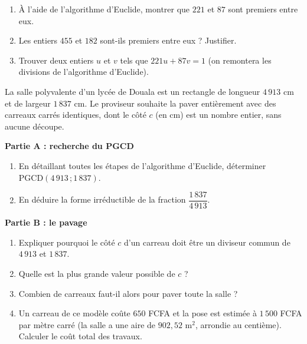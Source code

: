 \documentclass[11pt]{article}
\newcounter{popsec}
\newcounter{popsub}
\newcommand{\courssub}[1]{%
  \stepcounter{popsub}%
  \par\vspace{9pt}\noindent{\popxbold\fontsize{11.5}{13}\selectfont\color{popink}{\color{poporange}\thepopsec.\thepopsub}\hspace{6pt}#1}\par\nopagebreak\vspace{4pt}
}
\begin{document}
\begin{exercice}
\begin{enumerate}
\item À l'aide de l'algorithme d'Euclide, montrer que $221$ et $87$ sont premiers entre eux.
\item Les entiers $455$ et $182$ sont-ils premiers entre eux ? Justifier.
\item Trouver deux entiers $u$ et $v$ tels que $221u + 87v = 1$ (on remontera les divisions de l'algorithme d'Euclide).
\end{enumerate}
\end{exercice}

\courssub{Je me prépare au Bac}

\begin{exercice}
La salle polyvalente d'un lycée de Douala est un rectangle de longueur $4\,913$ cm et de largeur $1\,837$ cm. Le proviseur souhaite la paver entièrement avec des carreaux carrés identiques, dont le côté $c$ (en cm) est un nombre entier, sans aucune découpe.

\textbf{Partie A : recherche du PGCD}
\begin{enumerate}
\item En détaillant toutes les étapes de l'algorithme d'Euclide, déterminer $\mathrm{PGCD}(4\,913\,;1\,837)$.
\item En déduire la forme irréductible de la fraction $\dfrac{1\,837}{4\,913}$.
\end{enumerate}

\textbf{Partie B : le pavage}
\begin{enumerate}
\item Expliquer pourquoi le côté $c$ d'un carreau doit être un diviseur commun de $4\,913$ et $1\,837$.
\item Quelle est la plus grande valeur possible de $c$ ?
\item Combien de carreaux faut-il alors pour paver toute la salle ?
\item Un carreau de ce modèle coûte $650$ FCFA et la pose est estimée à $1\,500$ FCFA par mètre carré (la salle a une aire de $902,52$ m$^2$, arrondie au centième). Calculer le coût total des travaux.
\end{enumerate}
\end{exercice}
\end{document}
